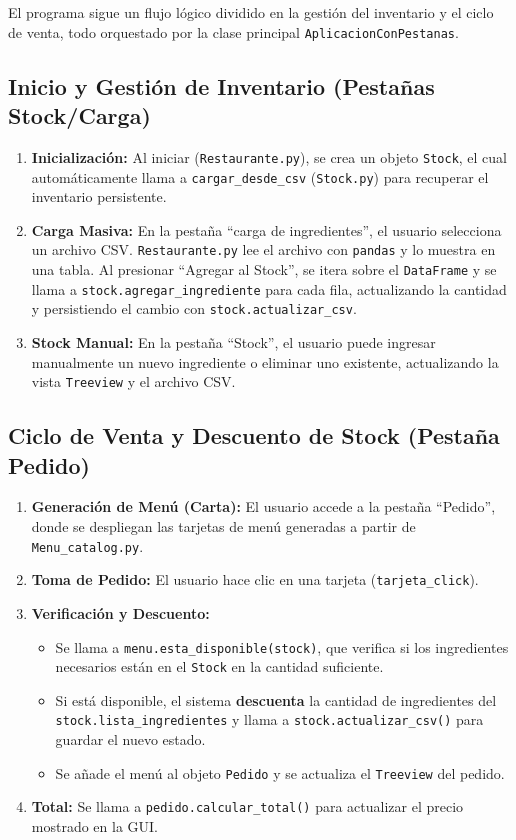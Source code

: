 \documentclass[a4paper, 12pt]{article}
\begin{document}
El programa sigue un flujo lógico dividido en la gestión del inventario y el ciclo de venta, todo orquestado por la clase principal \texttt{AplicacionConPestanas}.

\subsection{Inicio y Gestión de Inventario (Pestañas Stock/Carga)}
\begin{enumerate}
    \item \textbf{Inicialización:} Al iniciar (\texttt{Restaurante.py}), se crea un objeto \texttt{Stock}, el cual automáticamente llama a \texttt{cargar\_desde\_csv} (\texttt{Stock.py}) para recuperar el inventario persistente.
    \item \textbf{Carga Masiva:} En la pestaña ``carga de ingredientes'', el usuario selecciona un archivo CSV. \texttt{Restaurante.py} lee el archivo con \texttt{pandas} y lo muestra en una tabla. Al presionar ``Agregar al Stock'', se itera sobre el \texttt{DataFrame} y se llama a \texttt{stock.agregar\_ingrediente} para cada fila, actualizando la cantidad y persistiendo el cambio con \texttt{stock.actualizar\_csv}.
    \item \textbf{Stock Manual:} En la pestaña ``Stock'', el usuario puede ingresar manualmente un nuevo ingrediente o eliminar uno existente, actualizando la vista \texttt{Treeview} y el archivo CSV.
\end{enumerate}

\subsection{Ciclo de Venta y Descuento de Stock (Pestaña Pedido)}
\begin{enumerate}
    \item \textbf{Generación de Menú (Carta):} El usuario accede a la pestaña ``Pedido'', donde se despliegan las tarjetas de menú generadas a partir de \texttt{Menu\_catalog.py}.
    \item \textbf{Toma de Pedido:} El usuario hace clic en una tarjeta (\texttt{tarjeta\_click}).
    \item \textbf{Verificación y Descuento:}
    \begin{itemize}
        \item Se llama a \texttt{menu.esta\_disponible(stock)}, que verifica si los ingredientes necesarios están en el \texttt{Stock} en la cantidad suficiente.
        \item Si está disponible, el sistema \textbf{descuenta} la cantidad de ingredientes del \texttt{stock.lista\_ingredientes} y llama a \texttt{stock.actualizar\_csv()} para guardar el nuevo estado.
        \item Se añade el menú al objeto \texttt{Pedido} y se actualiza el \texttt{Treeview} del pedido.
    \end{itemize}
    \item \textbf{Total:} Se llama a \texttt{pedido.calcular\_total()} para actualizar el precio mostrado en la GUI.
\end{enumerate}
\end{document}
